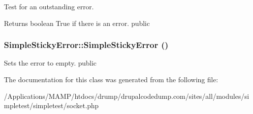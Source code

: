 \label{class_simple_sticky_error_a37e83b42c631c9650c2920913d0b0bc3}
Test for an outstanding error. \begin{DoxyReturn}{Returns}
boolean True if there is an error.  public 
\end{DoxyReturn}
\hypertarget{class_simple_sticky_error_aedb79c147da7f14e9ec87f9a4059d30c}{
\subsubsection[{SimpleStickyError}]{\setlength{\rightskip}{0pt plus 5cm}SimpleStickyError::SimpleStickyError ()}}
\label{class_simple_sticky_error_aedb79c147da7f14e9ec87f9a4059d30c}
Sets the error to empty.  public 

The documentation for this class was generated from the following file:\begin{DoxyCompactItemize}
\item 
/Applications/MAMP/htdocs/drump/drupalcodedump.com/sites/all/modules/simpletest/simpletest/socket.php\end{DoxyCompactItemize}
